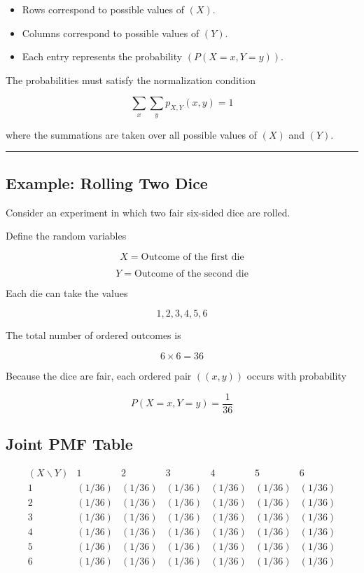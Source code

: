 \documentclass[12pt]{article}
\begin{document}
\begin{itemize}
\item Rows correspond to possible values of $(X)$.
\item Columns correspond to possible values of $(Y)$.
\item Each entry represents the probability $(P(X=x, Y=y))$.
\end{itemize}

The probabilities must satisfy the normalization condition

\[
\sum_x \sum_y p_{X,Y}(x,y) = 1
\]

where the summations are taken over all possible values of $(X)$ and $(Y)$.

\hrule
\vspace{0.5cm}

\subsection*{Example: Rolling Two Dice}

Consider an experiment in which two fair six-sided dice are rolled.

Define the random variables

\[
X = \text{Outcome of the first die}
\]

\[
Y = \text{Outcome of the second die}
\]

Each die can take the values

\[
1,2,3,4,5,6
\]

The total number of ordered outcomes is

\[
6 \times 6 = 36
\]

Because the dice are fair, each ordered pair $((x,y))$ occurs with probability

\[
P(X=x, Y=y) = \frac{1}{36}
\]

\subsection*{Joint PMF Table}

\[
\begin{array}{c|cccccc}
(X \backslash Y) & 1 & 2 & 3 & 4 & 5 & 6 \\
\hline
1 & (1/36) & (1/36) & (1/36) & (1/36) & (1/36) & (1/36) \\
2 & (1/36) & (1/36) & (1/36) & (1/36) & (1/36) & (1/36) \\
3 & (1/36) & (1/36) & (1/36) & (1/36) & (1/36) & (1/36) \\
4 & (1/36) & (1/36) & (1/36) & (1/36) & (1/36) & (1/36) \\
5 & (1/36) & (1/36) & (1/36) & (1/36) & (1/36) & (1/36) \\
6 & (1/36) & (1/36) & (1/36) & (1/36) & (1/36) & (1/36) \\
\end{array}
\]
\end{document}
